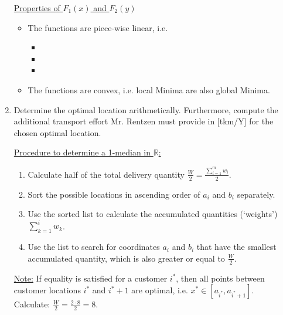 \begin{enumerate}
\begin{solution}
	\uline{Properties of $F_1\left(x\right)$ and $F_2\left(y\right)$}
		\begin{itemize}
			\item The functions are piece-wise linear, i.e.	
				\begin{itemize}
					\item \phantom{ the functions increase or decrease linearly between customer locations $a_i$ and $b_i$ in $x$ and $y$, respectively.}
					\item \phantom{ the functions are continuous, but not (everywhere) differentiable (specifically, not at the (customer) locations).}
					\item \phantom{ minima lie between sub-intervals with alternating slope signs.}
				\end{itemize}
			\item  The functions are convex, i.e. local Minima are also global Minima.
		\end{itemize}
	\end{solution}
	\item Determine the optimal location arithmetically. Furthermore, compute the additional transport effort Mr. Rentzen must provide in [tkm/Y] for the chosen optimal location. 
	\begin{solution}
	\uline{Procedure to determine a 1-median in $\mathbb{R}$:}\\
		\begin{enumerate}
			\item Calculate half of the total delivery quantity $\frac{W}{2}=\frac{\sum_{i=1}^m w_i}{2}$.
			\item Sort the possible locations in ascending order of $a_i$ and $b_i$ separately.
			\item Use the sorted list to calculate the accumulated quantities (`weights') $\sum_{k=1}^i w_k$.\\
			\item Use the list to search for coordinates $a_i$ and $b_i$ that have the smallest accumulated quantity, which is also greater or equal to $\frac{W}{2}$.
		\end{enumerate}
	\uline{Note:} If equality is satisfied for a customer $i^*$, then all points between customer locations $i^*$ and $i^*+1$ are optimal, i.e. $x^* \in \left[a_{i^*},a_{i^*+1}\right]$.\\
	
	Calculate: $\frac{W}{2}= \frac{2\cdot8}{2}=8$.\\
	

\end{solution}
\end{enumerate}
